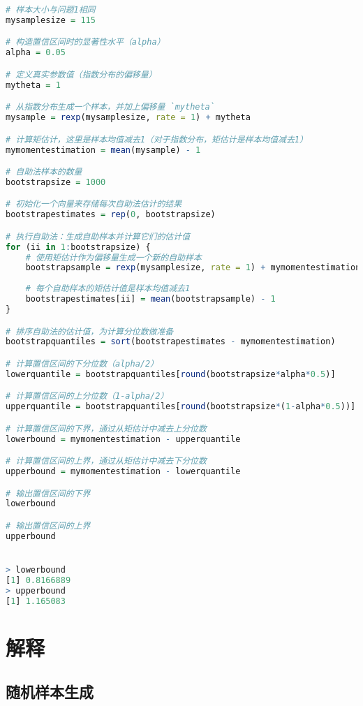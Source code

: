 \documentclass[UTF8]{report}
\theoremstyle{MyLineTheoremStyle} %
\theoremstyle{MyBlockTheoremStyle} %
\theoremstyle{MySubsubsectionStyle} %
\begin{document}
\begin{lstlisting}[language=R]
    # 样本大小与问题1相同
mysamplesize = 115

# 构造置信区间时的显著性水平（alpha）
alpha = 0.05

# 定义真实参数值（指数分布的偏移量）
mytheta = 1

# 从指数分布生成一个样本，并加上偏移量 `mytheta`
mysample = rexp(mysamplesize, rate = 1) + mytheta

# 计算矩估计，这里是样本均值减去1（对于指数分布，矩估计是样本均值减去1）
mymomentestimation = mean(mysample) - 1

# 自助法样本的数量
bootstrapsize = 1000

# 初始化一个向量来存储每次自助法估计的结果
bootstrapestimates = rep(0, bootstrapsize)

# 执行自助法：生成自助样本并计算它们的估计值
for (ii in 1:bootstrapsize) {
    # 使用矩估计作为偏移量生成一个新的自助样本
    bootstrapsample = rexp(mysamplesize, rate = 1) + mymomentestimation
    
    # 每个自助样本的矩估计值是样本均值减去1
    bootstrapestimates[ii] = mean(bootstrapsample) - 1
}

# 排序自助法的估计值，为计算分位数做准备
bootstrapquantiles = sort(bootstrapestimates - mymomentestimation)

# 计算置信区间的下分位数（alpha/2）
lowerquantile = bootstrapquantiles[round(bootstrapsize*alpha*0.5)]

# 计算置信区间的上分位数（1-alpha/2）
upperquantile = bootstrapquantiles[round(bootstrapsize*(1-alpha*0.5))]

# 计算置信区间的下界，通过从矩估计中减去上分位数
lowerbound = mymomentestimation - upperquantile

# 计算置信区间的上界，通过从矩估计中减去下分位数
upperbound = mymomentestimation - lowerquantile

# 输出置信区间的下界
lowerbound

# 输出置信区间的上界
upperbound


> lowerbound
[1] 0.8166889
> upperbound
[1] 1.165083


\end{lstlisting}


\section*{解释}

\subsection*{随机样本生成}
\end{document}
